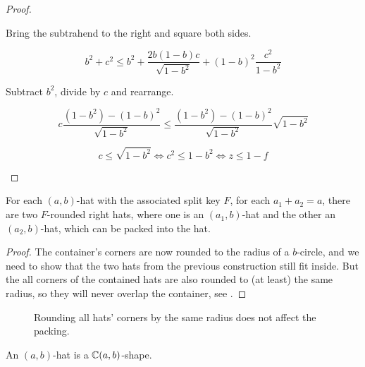 \documentclass[%
    a4paper,              %
    style=screen,          %
    bibliography=totoc,   %
    nexus,                %
    lnum,                 %
    extramargin,          %
]{tubsbook}
\begin{document}
\begin{proof}
\begin{itemize}
            Bring the subtrahend to the right and square both sides.

            $$b^2+c^2 \le b^2 + \frac{2b(1-b)c}{\sqrt{1-b^2}} + (1-b)^2\frac{c^2}{1-b^2}$$

            Subtract $b^2$, divide by $c$ and rearrange.

            $$c\frac{(1-b^2)-(1-b)^2}{\sqrt{1-b^2}} \le \frac{(1-b^2)-(1-b)^2}{\sqrt{1-b^2}}\sqrt{1-b^2}$$

            $$c \le \sqrt{1-b^2} \iff c^2 \le 1-b^2 \iff z \le 1-f$$
    \end{itemize}
\end{proof}

\begin{theorem}\label{th:roundedhatsinhat}
    For each $(a,b)$-hat with the associated split key $F$,
    for each $a_1 + a_2 = a$, there are two $F$-rounded right hats, where one is an $(a_1,b)$-hat and the other an $(a_2,b)$-hat, which can be packed into the hat.
\end{theorem}

\begin{proof}
    The container's corners are now rounded to the radius of a $b$-circle, and we need to show that the two hats from the previous construction still fit inside. But the all corners of the contained hats are also rounded to (at least) the same radius, so they will never overlap the container, see .
\end{proof}

\begin{figure}[htbp!]
    \centering


    \caption{Rounding all hats' corners by the same radius does not affect the packing.}
    \label{fig:rounding-hats}
\end{figure}

\begin{theorem}
    An $(a,b)$-hat is a $\mathbb{C}(a,b)$-shape.
\end{theorem}
\end{document}
